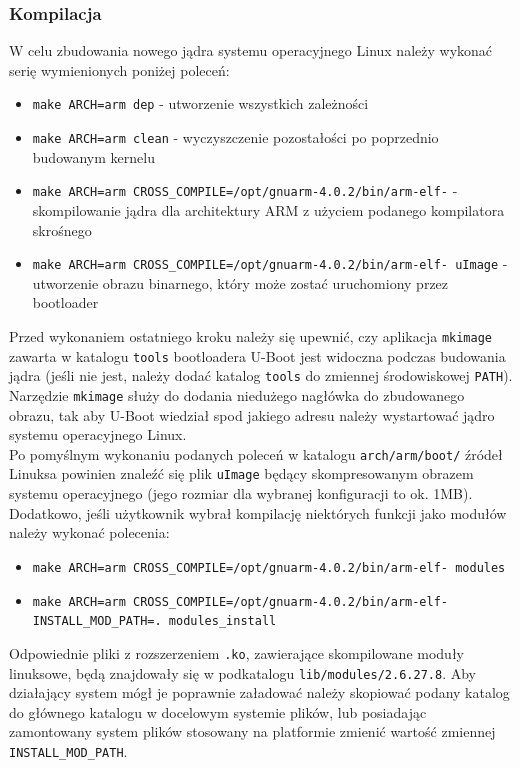\documentclass[a4paper,12pt]{book}
\begin{document}
				\subsubsection{Kompilacja}
					W celu zbudowania nowego jądra systemu operacyjnego Linux należy wykonać serię wymienionych poniżej poleceń:
					\begin{itemize}
						\item \texttt{make ARCH=arm dep} - utworzenie wszystkich zależności
						\item \texttt{make ARCH=arm clean} - wyczyszczenie pozostałości po poprzednio budowanym kernelu
						\item \texttt{make ARCH=arm CROSS\_COMPILE=/opt/gnuarm-4.0.2/bin/arm-elf-} - skompilowanie jądra dla architektury ARM z użyciem podanego kompilatora skrośnego
						\item \texttt{make ARCH=arm CROSS\_COMPILE=/opt/gnuarm-4.0.2/bin/arm-elf- uImage} - \\utworzenie obrazu binarnego, który może zostać uruchomiony przez bootloader
					\end{itemize}
					Przed wykonaniem ostatniego kroku należy się upewnić, czy aplikacja \texttt{mkimage} zawarta w katalogu \texttt{tools} bootloadera U-Boot jest widoczna podczas budowania jądra (jeśli nie jest, należy dodać katalog \texttt{tools} do zmiennej środowiskowej \texttt{PATH}). Narzędzie \texttt{mkimage} służy do dodania niedużego nagłówka do zbudowanego obrazu, tak aby U-Boot wiedział spod jakiego adresu należy wystartować jądro systemu operacyjnego Linux.\\
					Po pomyślnym wykonaniu podanych poleceń w katalogu \texttt{arch/arm/boot/} źródeł Linuksa powinien znaleźć się plik \texttt{uImage} będący skompresowanym obrazem systemu operacyjnego (jego rozmiar dla wybranej konfiguracji to ok. 1MB).\\
					Dodatkowo, jeśli użytkownik wybrał kompilację niektórych funkcji jako modułów należy wykonać polecenia:
					\begin{itemize}
						\item \texttt{make ARCH=arm CROSS\_COMPILE=/opt/gnuarm-4.0.2/bin/arm-elf- modules}
						\item \texttt{make ARCH=arm CROSS\_COMPILE=/opt/gnuarm-4.0.2/bin/arm-elf- \\INSTALL\_MOD\_PATH=. modules\_install}
					\end{itemize}
					Odpowiednie pliki z rozszerzeniem \texttt{.ko}, zawierające skompilowane moduły linuksowe, będą znajdowały się w podkatalogu \texttt{lib/modules/2.6.27.8}. Aby działający system mógł je poprawnie załadować należy skopiować podany katalog do głównego katalogu w docelowym systemie plików, lub posiadając zamontowany system plików stosowany na platformie zmienić wartość zmiennej \texttt{INSTALL\_MOD\_PATH}.
\end{document}
